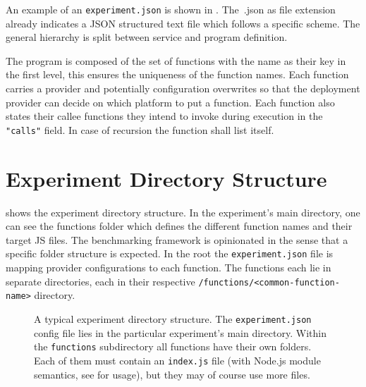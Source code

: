 \documentclass[../main.tex]{subfiles}
\begin{document}
An example of an \texttt{experiment.json} is shown in .
The~.json as file extension already indicates a JSON structured text file which follows a specific scheme. 
The general hierarchy is split between service and program definition.

The program is  composed of the set of functions with the name as their key in the first level, 
this ensures the uniqueness of the function names. 
Each function carries a provider and potentially configuration overwrites so that the deployment provider can decide 
on which platform to put a function. 
Each function also states their callee functions they intend to invoke during execution in the \texttt{"calls"} field. 
In case of recursion the function shall list itself. 

\section{Experiment Directory Structure}%
\label{sec:experimentDirectoryStructure}

 shows the experiment directory structure.
In the experiment's main directory, one can see the functions folder which defines the different function names and their target JS files. 
The benchmarking framework is opinionated in the sense that a specific folder structure is expected. 
In the root the \texttt{experiment.json} file is mapping provider configurations to each function. 
The functions each lie in separate directories, each in their respective \texttt{/functions/<common-function-name>} directory.

\begin{figure}
\begin{tcolorbox}
\end{tcolorbox}
\caption[Typical Experiment Directory Structure.]{%
  A typical experiment directory structure. The \texttt{experiment.json} config file lies in the particular experiment's main directory.
  Within the \texttt{functions} subdirectory all functions have their own folders. 
  Each of them must contain an \texttt{index.js} file (with Node.js module semantics, see  for usage),
  but they may of course use more files.
}%
\label{fig:experimentDirTree}
\end{figure}
\end{document}
